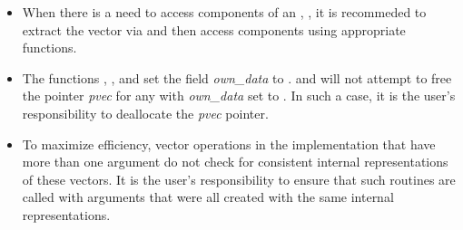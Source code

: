 \begin{itemize}
                                        
\item
  When there is a need to access components of an , , 
  it is recommeded to extract the {\petsc} vector via       
   and then access components using 
  appropriate {\petsc} functions.        
                                                               
\item
  {\warn}The functions , , and
   set the field {\em own\_data} to .   
   and 
  will not attempt to free the pointer {\em pvec} for any  with
  {\em own\_data} set to . In such a case, it is the user's responsibility to
  deallocate the {\em pvec} pointer.

\item
  {\warn}To maximize efficiency, vector operations in the {\nvecpetsc} implementation
  that have more than one  argument do not check for
  consistent internal representations of these vectors. It is the user's 
  responsibility to ensure that such routines are called with 
  arguments that were all created with the same internal representations.

\end{itemize}

